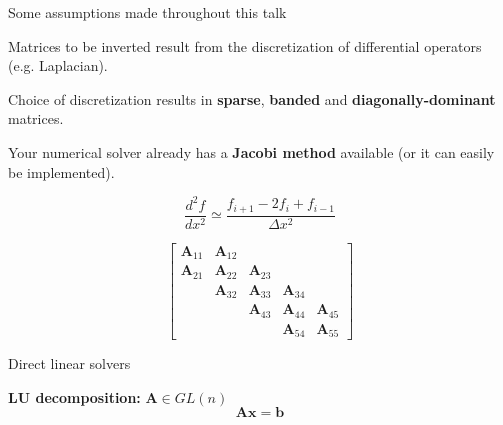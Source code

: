 \documentclass[aspectratio=169]{beamer}
\begin{document}
\begin{frame}[t, c]{Some assumptions made throughout this talk}{}
  \begin{minipage}{.58\textwidth}
    \begin{overprint}
      Matrices to be inverted result from the discretization of differential operators (e.g. Laplacian).

      Choice of discretization results in \alert{\textbf{sparse}}, \alert{\textbf{banded}} and \alert{\textbf{diagonally-dominant}} matrices.

      Your numerical solver already has a \alert{\textbf{Jacobi method}} available (or it can easily be implemented).
    \end{overprint}
  \end{minipage}%
  \hfill
  \begin{minipage}{.38\textwidth}
    \begin{overprint}
      \[
      \dfrac{d^2 f}{dx^2} \simeq \dfrac{f_{i+1} - 2f_i + f_{i-1}}{\Delta x^2}
      \]

      \[
      \begin{bmatrix}
        \bm{A}_{11} & \bm{A}_{12} &  &  &  \\
        \bm{A}_{21} & \bm{A}_{22} & \bm{A}_{23} &  & \\
         & \bm{A}_{32} & \bm{A}_{33} & \bm{A}_{34} &  \\
         &  & \bm{A}_{43} & \bm{A}_{44} & \bm{A}_{45} \\
          &  &  & \bm{A}_{54} & \bm{A}_{55}
      \end{bmatrix}
      \]
    \end{overprint}
  \end{minipage}

  \vspace{-1cm}
\end{frame}

\begin{frame}[t, c]{Direct linear solvers}{}
  \begin{minipage}{.68\textwidth}
    \centering
    \textbf{LU decomposition:} $\bm{A} \in GL(n)$
    \medskip
    \Large
    \[
    \bm{Ax} = \bm{b}
    \]
  \end{minipage}%
  \hfill
  \begin{minipage}{.28\textwidth}
  \end{minipage}
\end{frame}
\end{document}

